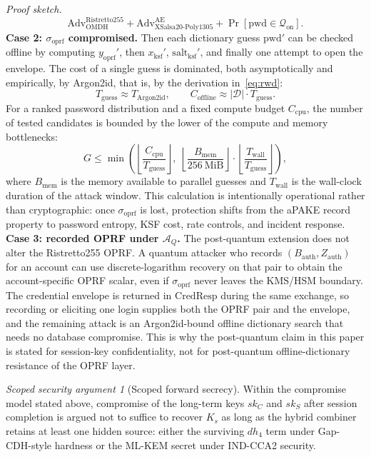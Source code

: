 \documentclass[preprint,12pt]{elsarticle}
\newcommand{\sigoprf}{\sigma_{\mathrm{oprf}}}
\theoremstyle{remark}
\newtheorem{claim}{Scoped security argument}[section]
\newenvironment{sketchproof}{\par\noindent\textit{Proof sketch.}\ }{\par}
\begin{document}
\begin{sketchproof}
\[  \mathrm{Adv}_{\mathrm{OMDH}}^{\mathrm{Ristretto255}} +
  \mathrm{Adv}_{\mathrm{XSalsa20\text{-}Poly1305}}^{\mathrm{AE}} +
  \Pr[\mathrm{pwd} \in \mathcal{Q}_{\mathrm{on}}].
\]
\textbf{Case 2: \textnormal{$\sigoprf$ compromised.}} Then
each dictionary guess $\mathrm{pwd}'$ can be checked offline by
computing $y_{\mathrm{oprf}}'$, then
$x_{\mathrm{ksf}}'$, $\mathrm{salt}_{\mathrm{ksf}}'$, and finally one
attempt to open the envelope. The cost of a single guess is dominated,
both asymptotically and empirically, by Argon2id, that is, by the
derivation in~\eqref{eq:rwd}:
\[
  T_{\mathrm{guess}} \approx T_{\mathrm{Argon2id}},\qquad
  C_{\mathrm{offline}} \approx |\mathcal{D}| \cdot T_{\mathrm{guess}}.
\]
For a ranked password distribution and a fixed compute budget $C_{\mathrm{cpu}}$, the
number of tested candidates is bounded by the lower of the compute and
memory bottlenecks:
\[
  G \leq
  \min\!\left(
    \left\lfloor \frac{C_{\mathrm{cpu}}}{T_{\mathrm{guess}}} \right\rfloor,\;
    \left\lfloor \frac{B_{\mathrm{mem}}}{256~\mathrm{MiB}} \right\rfloor
      \cdot
      \left\lfloor \frac{T_{\mathrm{wall}}}{T_{\mathrm{guess}}} \right\rfloor
  \right),
\]
where $B_{\mathrm{mem}}$ is the memory available to parallel guesses and
$T_{\mathrm{wall}}$ is the wall-clock duration of the attack
window. This calculation is intentionally operational rather than
cryptographic: once $\sigoprf$ is lost, protection shifts from the
aPAKE record property to password entropy, KSF cost, rate controls, and
incident response.
\textbf{Case 3: \textnormal{recorded OPRF under $\mathcal{A}_Q$.}}
The post-quantum extension does not alter the Ristretto255 OPRF. A quantum
attacker who records $(B_{\mathrm{auth}}, Z_{\mathrm{auth}})$ for an account
can use discrete-logarithm recovery on that pair to obtain the
account-specific OPRF scalar, even if $\sigoprf$ never leaves the KMS/HSM
boundary. The credential envelope is returned in $\mathrm{CredResp}$ during the
same exchange, so recording or eliciting one login supplies both the OPRF pair
and the envelope, and the remaining attack is an Argon2id-bound offline
dictionary search that needs no database compromise. This is why the
post-quantum claim in this paper is stated for session-key confidentiality,
not for post-quantum offline-dictionary resistance of the OPRF layer.
\end{sketchproof}

\begin{claim}[Scoped forward secrecy]
Within the compromise model stated above, compromise of the long-term
keys $sk_C$ and $sk_S$ after session completion is argued not to suffice
to recover $K_s$ as long as the hybrid combiner retains at least one hidden
source: either the surviving $dh_4$ term under Gap-CDH-style hardness or the
ML-KEM secret under IND-CCA2 security.
\end{claim}
\end{document}
